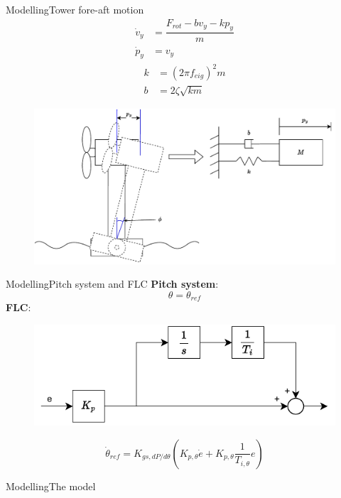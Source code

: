 \begin{frame}{Modelling}{Tower fore-aft motion}
	\begin{equation}
		\begin{split}
			\dot{v}_y & = \dfrac{F_{rot} - b v_y - k p_y}{m} \\
			\dot{p}_y & = v_y
		\end{split}
	\end{equation}
	\begin{equation}
		\begin{split}
			k & = (2 \pi f_{eig})^2 m \\
			b & = 2 \zeta \sqrt{k m}
		\end{split}
	\end{equation}
	\begin{figure}[ht]
		\centering
		\includegraphics[width=0.9\linewidth]{../Graphics/wtLinForeAftMotionModel.pdf}
		\label{fig:wtLin_fore-aft_diagram}
	\end{figure}
\end{frame}


\begin{frame}{Modelling}{Pitch system and FLC}
	\textbf{Pitch system}:
	\begin{equation}\label{eq:comp_pitch_freq}
		\theta = \theta_{ref}
	\end{equation}
	\textbf{FLC}:
	\begin{figure}[ht]
		\centering
		\includegraphics[width=0.65\linewidth]{../Graphics/PiController.pdf}
		\label{fig:PIcontroller}
	\end{figure}
	\begin{equation}\label{eq:comp_flc_time}
		\dot{\theta}_{ref} = K_{gs,dP/d\theta} (K_{p, \theta} \dot{e} + K_{p, \theta} \dfrac{1}{T_{i, \theta}} e)
	\end{equation}

\end{frame}


\begin{frame}{Modelling}{The model}
		
\end{frame}